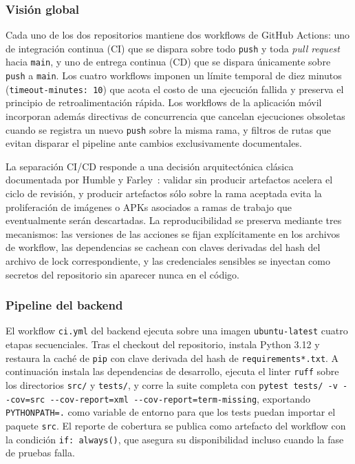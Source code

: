\subsubsection{Visión global}

Cada uno de los dos repositorios mantiene dos workflows de GitHub
Actions: uno de integración continua (CI) que se dispara sobre todo
\texttt{push} y toda \textit{pull request} hacia \texttt{main}, y
uno de entrega continua (CD) que se dispara únicamente sobre
\texttt{push} a \texttt{main}. Los cuatro workflows imponen un
límite temporal de diez minutos (\texttt{timeout-minutes: 10}) que
acota el costo de una ejecución fallida y preserva el principio de
retroalimentación rápida. Los workflows de la aplicación móvil
incorporan además directivas de concurrencia que cancelan
ejecuciones obsoletas cuando se registra un nuevo \texttt{push}
sobre la misma rama, y filtros de rutas que evitan disparar el
pipeline ante cambios exclusivamente documentales.

La separación CI/CD responde a una decisión arquitectónica clásica
documentada por Humble y Farley~\cite{humble2010cd}: validar sin
producir artefactos acelera el ciclo de revisión, y producir
artefactos sólo sobre la rama aceptada evita la proliferación de
imágenes o APKs asociados a ramas de trabajo que eventualmente
serán descartadas. La reproducibilidad se preserva mediante tres
mecanismos: las versiones de las acciones se fijan explícitamente
en los archivos de workflow, las dependencias se cachean con claves
derivadas del hash del archivo de lock correspondiente, y las
credenciales sensibles se inyectan como secretos del repositorio
sin aparecer nunca en el código.

\subsubsection{Pipeline del backend}

El workflow \texttt{ci.yml} del backend ejecuta sobre una imagen
\texttt{ubuntu-latest} cuatro etapas secuenciales. Tras el checkout
del repositorio, instala Python 3.12 y restaura la caché de
\texttt{pip} con clave derivada del hash de
\texttt{requirements*.txt}. A continuación instala las dependencias
de desarrollo, ejecuta el linter \texttt{ruff} sobre los directorios
\texttt{src/} y \texttt{tests/}, y corre la suite completa con
\texttt{pytest tests/ -v -{}-cov=src -{}-cov-report=xml
-{}-cov-report=term-missing}, exportando \texttt{PYTHONPATH=.} como
variable de entorno para que los tests puedan importar el paquete
\texttt{src}. El reporte de cobertura se publica como artefacto del
workflow con la condición \texttt{if: always()}, que asegura su
disponibilidad incluso cuando la fase de pruebas falla.

